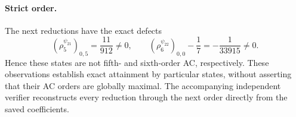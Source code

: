 \documentclass[11pt]{article}
\begin{document}
\paragraph{Strict order.}
The next reductions have the exact defects
\[
(\rho_5^{\psi_{21}})_{0,5}=\frac{11}{912}\ne0,
\qquad
(\rho_6^{\psi_{22}})_{0,0}-\frac17=-\frac1{33915}\ne0.
\]
Hence these states are not fifth- and sixth-order AC, respectively.
These observations establish exact attainment by particular states, without
asserting that their AC orders are globally maximal.
The accompanying independent verifier reconstructs every reduction through
the next order directly from the saved coefficients.
\end{document}
